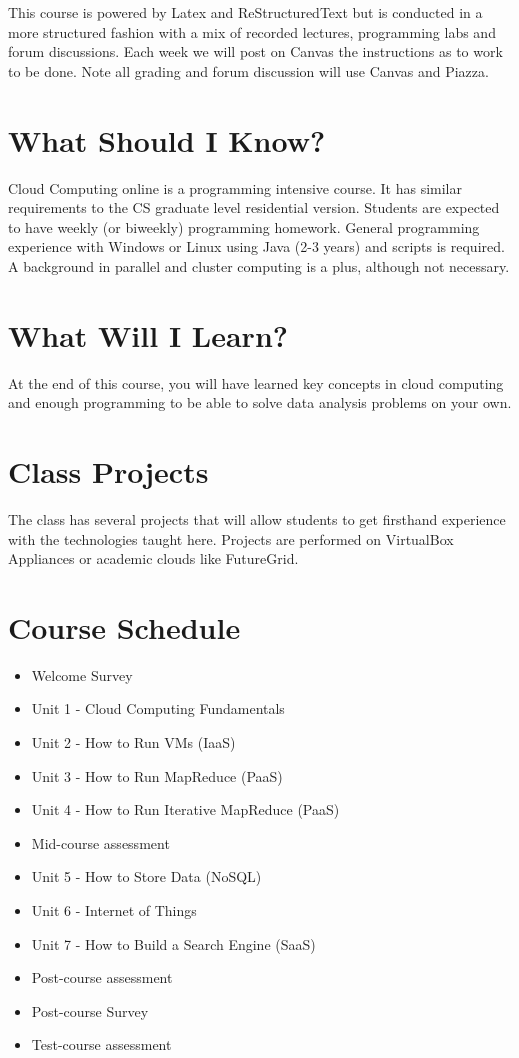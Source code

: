 This course is powered by Latex and ReStructuredText but is conducted
in a more structured fashion with a mix of recorded lectures,
programming labs and forum discussions. Each week we will post on
Canvas the instructions as to work to be done. Note all grading and
forum discussion will use Canvas and Piazza.

\section{What Should I Know?}

Cloud Computing online is a programming intensive course. It has
similar requirements to the CS graduate level residential
version. Students are expected to have weekly (or biweekly)
programming homework. General programming experience with Windows or
Linux using Java (2-3 years) and scripts is required. A background in
parallel and cluster computing is a plus, although not necessary.

\section{What Will I Learn?}

At the end of this course, you will have learned key concepts in cloud
computing and enough programming to be able to solve data analysis
problems on your own.

\section{Class Projects}

The class has several projects that will allow students to get
firsthand experience with the technologies taught here. Projects are
performed on VirtualBox Appliances or academic clouds like FutureGrid.

\section{Course Schedule}



\begin{itemize}
  \item Welcome Survey
  \item Unit 1 - Cloud Computing Fundamentals
  \item Unit 2 - How to Run VMs (IaaS)
  \item Unit 3 - How to Run MapReduce (PaaS)
  \item Unit 4 - How to Run Iterative MapReduce (PaaS)
  \item Mid-course assessment
  \item Unit 5 - How to Store Data (NoSQL)
  \item Unit 6 - Internet of Things
  \item Unit 7 - How to Build a Search Engine (SaaS)
  \item Post-course assessment
  \item Post-course Survey
  \item Test-course assessment
\end{itemize}

